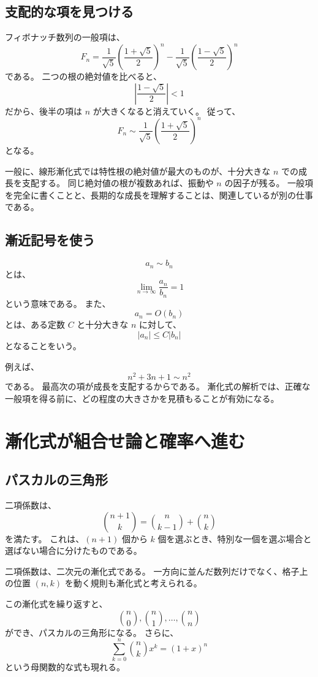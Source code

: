 \subsection{支配的な項を見つける}

フィボナッチ数列の一般項は、
\[
  F_n=\frac1{\sqrt5}\left(\frac{1+\sqrt5}{2}\right)^n
  -\frac1{\sqrt5}\left(\frac{1-\sqrt5}{2}\right)^n
\]
である。
二つの根の絶対値を比べると、
\[
  \left|\frac{1-\sqrt5}{2}\right|<1
\]
だから、後半の項は $n$ が大きくなると消えていく。
従って、
\[
  F_n\sim
  \frac1{\sqrt5}
  \left(\frac{1+\sqrt5}{2}\right)^n
\]
となる。

一般に、線形漸化式では特性根の絶対値が最大のものが、十分大きな $n$ での成長を支配する。
同じ絶対値の根が複数あれば、振動や $n$ の因子が残る。
一般項を完全に書くことと、長期的な成長を理解することは、関連しているが別の仕事である。

\subsection{漸近記号を使う}

\[
  a_n\sim b_n
\]
とは、
\[
  \lim_{n\to\infty}\frac{a_n}{b_n}=1
\]
という意味である。
また、
\[
  a_n=O(b_n)
\]
とは、ある定数 $C$ と十分大きな $n$ に対して、
\[
  |a_n|\leq C|b_n|
\]
となることをいう。

例えば、
\[
  n^2+3n+1\sim n^2
\]
である。
最高次の項が成長を支配するからである。
漸化式の解析では、正確な一般項を得る前に、どの程度の大きさかを見積もることが有効になる。

\section{漸化式が組合せ論と確率へ進む}

\subsection{パスカルの三角形}

二項係数は、
\[
  \binom{n+1}{k}
  =
  \binom{n}{k-1}+\binom{n}{k}
\]
を満たす。
これは、$(n+1)$ 個から $k$ 個を選ぶとき、特別な一個を選ぶ場合と選ばない場合に分けたものである。

二項係数は、二次元の漸化式である。
一方向に並んだ数列だけでなく、格子上の位置 $(n,k)$ を動く規則も漸化式と考えられる。

この漸化式を繰り返すと、
\[
  \binom{n}{0},\binom{n}{1},\ldots,\binom{n}{n}
\]
ができ、パスカルの三角形になる。
さらに、
\[
  \sum_{k=0}^{n}\binom{n}{k}x^k=(1+x)^n
\]
という母関数的な式も現れる。

